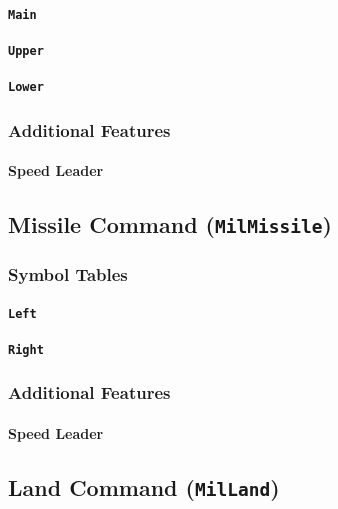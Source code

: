 \documentclass[a4paper, titlepage]{article}
\begin{document}
\paragraph{\texttt{Main}}

\paragraph{\texttt{Upper}}

\paragraph{\texttt{Lower}}

\subsubsection{Additional Features}

\paragraph{Speed Leader}

\subsection{Missile Command (\textbf{\texttt{MilMissile}})}

\subsubsection{Symbol Tables}

\paragraph{\texttt{Left}}

\paragraph{\texttt{Right}}

\subsubsection{Additional Features}

\paragraph{Speed Leader}

\subsection{Land Command (\textbf{\texttt{MilLand}})}
\end{document}
